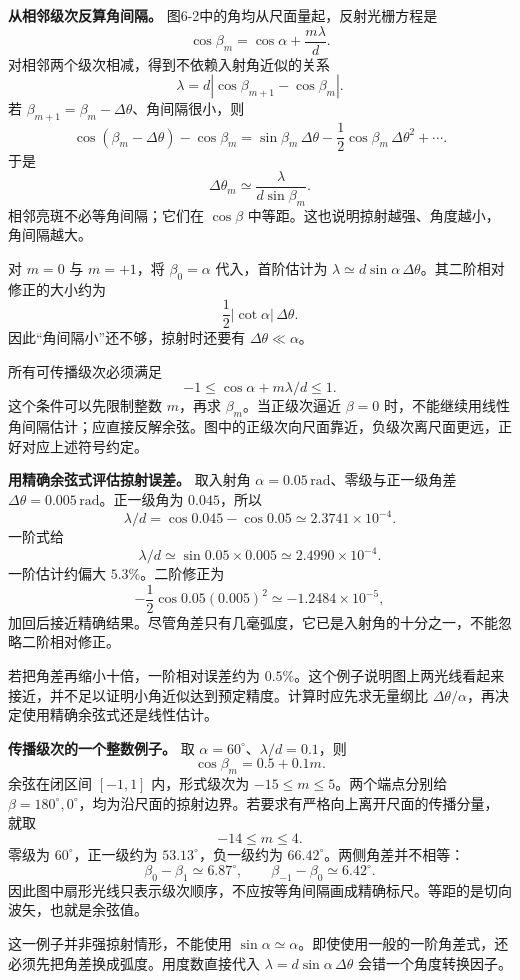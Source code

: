 \documentclass[12pt,a4paper,UTF8]{ctexart}
\begin{document}
\textbf{从相邻级次反算角间隔。} 图6-2中的角均从尺面量起，反射光栅方程是
\[
\cos\beta_m=\cos\alpha+\frac{m\lambda}{d}.
\] 对相邻两个级次相减，得到不依赖入射角近似的关系 \[
\lambda=d|\cos\beta_{m+1}-\cos\beta_m|.
\] 若 \(\beta_{m+1}=\beta_m-\Delta\theta\)、角间隔很小，则 \[
\cos(\beta_m-\Delta\theta)-\cos\beta_m
=\sin\beta_m\,\Delta\theta-\frac12\cos\beta_m\,\Delta\theta^2+\cdots.
\] 于是 \[
\Delta\theta_m\simeq\frac{\lambda}{d\sin\beta_m}.
\] 相邻亮斑不必等角间隔；它们在 \(\cos\beta\)
中等距。这也说明掠射越强、角度越小，角间隔越大。

对 \(m=0\) 与 \(m=+1\)，将 \(\beta_0=\alpha\) 代入，首阶估计为
\(\lambda\simeq d\sin\alpha\,\Delta\theta\)。其二阶相对修正的大小约为 \[
\frac12|\cot\alpha|\,\Delta\theta.
\] 因此``角间隔小''还不够，掠射时还要有 \(\Delta\theta\ll\alpha\)。

所有可传播级次必须满足 \[
-1\le\cos\alpha+m\lambda/d\le1.
\] 这个条件可以先限制整数 \(m\)，再求 \(\beta_m\)。当正级次逼近
\(\beta=0\)
时，不能继续用线性角间隔估计；应直接反解余弦。图中的正级次向尺面靠近，负级次离尺面更远，正好对应上述符号约定。

\textbf{用精确余弦式评估掠射误差。} 取入射角
\(\alpha=0.05\,\mathrm{rad}\)、零级与正一级角差
\(\Delta\theta=0.005\,\mathrm{rad}\)。正一级角为 \(0.045\)，所以 \[
\lambda/d=\cos0.045-\cos0.05\simeq2.3741\times10^{-4}.
\] 一阶式给 \[
\lambda/d\simeq\sin0.05\times0.005\simeq2.4990\times10^{-4}.
\] 一阶估计约偏大 \(5.3\%\)。二阶修正为 \[
-\frac12\cos0.05(0.005)^2\simeq-1.2484\times10^{-5},
\]
加回后接近精确结果。尽管角差只有几毫弧度，它已是入射角的十分之一，不能忽略二阶相对修正。

若把角差再缩小十倍，一阶相对误差约为
\(0.5\%\)。这个例子说明图上两光线看起来接近，并不足以证明小角近似达到预定精度。计算时应先求无量纲比
\(\Delta\theta/\alpha\)，再决定使用精确余弦式还是线性估计。

\textbf{传播级次的一个整数例子。} 取
\(\alpha=60^\circ\)、\(\lambda/d=0.1\)，则 \[
\cos\beta_m=0.5+0.1m.
\] 余弦在闭区间 \([-1,1]\) 内，形式级次为
\(-15\le m\le5\)。两个端点分别给
\(\beta=180^\circ,0^\circ\)，均为沿尺面的掠射边界。若要求有严格向上离开尺面的传播分量，就取
\[
-14\le m\le4.
\] 零级为 \(60^\circ\)，正一级约为 \(53.13^\circ\)，负一级约为
\(66.42^\circ\)。两侧角差并不相等： \[
\beta_0-\beta_1\simeq6.87^\circ,
\qquad\beta_{-1}-\beta_0\simeq6.42^\circ.
\]
因此图中扇形光线只表示级次顺序，不应按等角间隔画成精确标尺。等距的是切向波矢，也就是余弦值。

这一例子并非强掠射情形，不能使用
\(\sin\alpha\simeq\alpha\)。即使使用一般的一阶角差式，还必须先把角差换成弧度。用度数直接代入
\(\lambda=d\sin\alpha\,\Delta\theta\) 会错一个角度转换因子。
\end{document}

